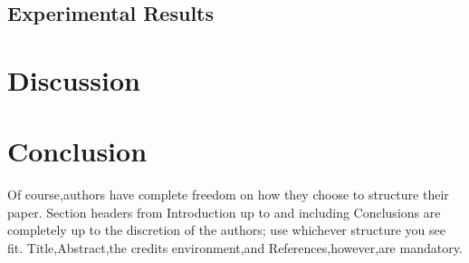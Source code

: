 \documentclass[runningheads]{llncs}
\begin{document}
\subsection{Experimental Results}

\section{Discussion}

\section{Conclusion}

Of course,authors have complete freedom on how they choose to structure their paper. Section headers from Introduction up to and including Conclusions are completely up to the discretion of the authors; use whichever structure you see fit. Title,Abstract,the credits environment,and References,however,are mandatory.
\end{document}
